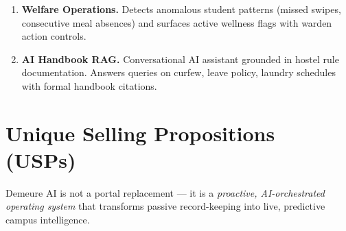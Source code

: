 \documentclass[12pt, a4paper]{article}
\begin{document}
\begin{enumerate}[leftmargin=1.4em, itemsep=6pt]
  \item \textbf{Welfare Operations.} Detects anomalous student patterns (missed swipes, consecutive meal absences) and surfaces active wellness flags with warden action controls.

  \item \textbf{AI Handbook RAG.} Conversational AI assistant grounded in hostel rule documentation. Answers queries on curfew, leave policy, laundry schedules with formal handbook citations.

\end{enumerate}

\section{Unique Selling Propositions (USPs)}

\begin{tcolorbox}[uspbox, title={\bfseries\small What Makes Demeure AI Different}]
Demeure AI is not a portal replacement — it is a \textit{proactive, AI-orchestrated operating system} that transforms passive record-keeping into live, predictive campus intelligence.
\end{tcolorbox}

\vspace{10pt}
\end{document}

